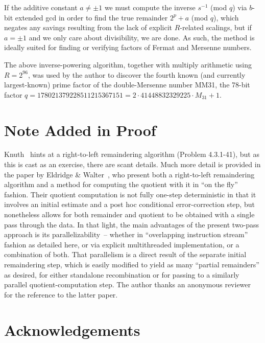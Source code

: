 \documentclass{article}
\begin{document}
If the additive constant $a \ne\pm 1$ we must compute the inverse $s^{-1}$ (mod $q$) via $b$-bit extended gcd in order to find the true remainder $2^p + a$ (mod $q$), which negates any savings resulting from the lack of explicit $R$-related scalings, but if $a = \pm 1$ and we only care about divisibility, we are done. As such, the method is ideally suited for finding or verifying factors of Fermat and Mersenne numbers.

The above inverse-powering algorithm, together with multiply arithmetic using $R = 2^{96}$, was used by the author to discover the fourth known (and currently largest-known) prime factor of the double-Mersenne number MM31, the 78-bit factor $q = 178021379228511215367151 = 2 \cdot 41448832329225 \cdot M_{31} + 1$. \cite{WMMM,MM31}



\section{Note Added in Proof}

Knuth~\cite{Knuth} hints at a right-to-left remaindering algorithm (Problem 4.3.1-41), but as this is cast as an exercise, there are scant details. Much more detail is provided in the paper by Eldridge \& Walter~\cite{EldWalt93}, who present both a right-to-left remaindering algorithm and a method for computing the quotient with it in ``on the fly'' fashion. Their quotient computation is not fully one-step deterministic in that it involves an initial estimate and a post hoc conditional error-correction step, but nonetheless allows for both remainder and quotient to be obtained with a single pass through the data. In that light, the main advantages of the present two-pass approach is its parallelizability~-- whether in ``overlapping instruction stream'' fashion as detailed here, or via explicit multithreaded implementation, or a combination of both. That parallelism is a direct result of the separate initial remaindering step, which is easily modified to yield as many ``partial remainders'' as desired, for either standalone recombination or for passing to a similarly parallel quotient-computation step. The author thanks an anonymous reviewer for the reference to the latter paper.



\section{Acknowledgements}
\end{document}
